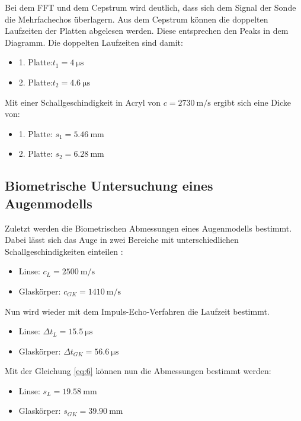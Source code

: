 Bei dem FFT und dem Cepstrum wird deutlich, dass sich dem Signal der Sonde die Mehrfachechos
überlagern. Aus dem Cepstrum können die doppelten Laufzeiten der Platten abgelesen werden.
Diese entsprechen den Peaks in dem Diagramm. Die doppelten Laufzeiten sind damit:

\begin{itemize}
  \item 1. Platte:$t_1 = \SI{4}{\micro\second}$
  \item 2. Platte:$t_2 = \SI{4.6}{\micro\second}$
\end{itemize}

Mit einer Schallgeschindigkeit in Acryl von $c = \SI{2730}{\meter\per\second}$ ergibt sich
eine Dicke von:

\begin{itemize}
  \item 1. Platte: $s_1 = \SI{5.46}{\milli\meter}$
  \item 2. Platte: $s_2 = \SI{6.28}{\milli\meter}$
\end{itemize}

\subsection{Biometrische Untersuchung eines Augenmodells}

Zuletzt werden die Biometrischen Abmessungen eines Augenmodells bestimmt. Dabei lässt
sich das Auge in zwei Bereiche mit unterschiedlichen Schallgeschindigkeiten einteilen \cite{1}:

\begin{itemize}
  \item Linse: $c_L = \SI{2500}{\meter\per\second}$
  \item Glaskörper: $c_{GK} = \SI{1410}{\meter\per\second}$
\end{itemize}

Nun wird wieder mit dem Impuls-Echo-Verfahren die Laufzeit bestimmt.

\begin{itemize}
  \item Linse: $\Delta t_L = \SI{15.5}{\micro\second}$
  \item Glaskörper: $\Delta t_{GK} = \SI{56.6}{\micro\second}$
\end{itemize}

Mit der Gleichung \ref{eq:6} können nun die Abmessungen bestimmt werden:

\begin{itemize}
  \item Linse: $s_L = \SI{19.58}{\milli\meter}$
  \item Glaskörper: $s_{GK} = \SI{39.90}{\milli\meter}$
\end{itemize}
